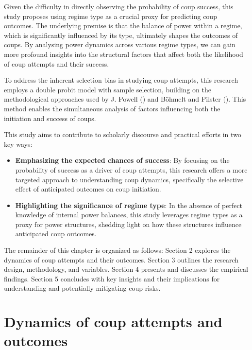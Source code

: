 \documentclass[
  12pt,
]{report}
\begin{document}
Given the difficulty in directly observing the probability of coup
success, this study proposes using regime type as a crucial proxy for
predicting coup outcomes. The underlying premise is that the balance of
power within a regime, which is significantly influenced by its type,
ultimately shapes the outcomes of coups. By analysing power dynamics
across various regime types, we can gain more profound insights into the
structural factors that affect both the likelihood of coup attempts and
their success.

To address the inherent selection bias in studying coup attempts, this
research employs a double probit model with sample selection, building
on the methodological approaches used by J. Powell
() and Böhmelt and Pilster
(). This method enables the
simultaneous analysis of factors influencing both the initiation and
success of coups.

This study aims to contribute to scholarly discourse and practical
efforts in two key ways:

\begin{itemize}
\item
  \textbf{Emphasizing the expected chances of success}: By focusing on
  the probability of success as a driver of coup attempts, this research
  offers a more targeted approach to understanding coup dynamics,
  specifically the selective effect of anticipated outcomes on coup
  initiation.
\item
  \textbf{Highlighting the significance of regime type}: In the absence
  of perfect knowledge of internal power balances, this study leverages
  regime types as a proxy for power structures, shedding light on how
  these structures influence anticipated coup outcomes.
\end{itemize}

The remainder of this chapter is organized as follows: Section 2
explores the dynamics of coup attempts and their outcomes. Section 3
outlines the research design, methodology, and variables. Section 4
presents and discusses the empirical findings. Section 5 concludes with
key insights and their implications for understanding and potentially
mitigating coup risks.

\section{Dynamics of coup attempts and
outcomes}\label{dynamics-of-coup-attempts-and-outcomes}
\end{document}

